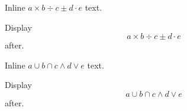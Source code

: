 \documentclass[12pt]{article}
\begin{document}
Inline $a \times b \div c \pm d \cdot e$ text.

Display \[ a \times b \div c \pm d \cdot e \] after.

Inline $a \cup b \cap c \wedge d \vee e$ text.

Display \[ a \cup b \cap c \wedge d \vee e \] after.
\end{document}
